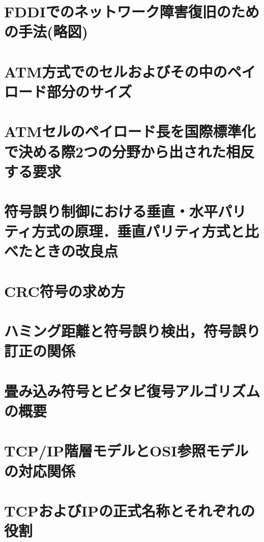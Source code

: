 \documentclass[10.5pt]{jsarticle}
\begin{document}
\section{FDDIでのネットワーク障害復旧のための手法(略図)}



\section{ATM方式でのセルおよびその中のペイロード部分のサイズ}



\section{ATMセルのペイロード長を国際標準化で決める際2つの分野から出された相反する要求}



\section{符号誤り制御における垂直・水平パリティ方式の原理．垂直パリティ方式と比べたときの改良点}



\section{CRC符号の求め方}



\section{ハミング距離と符号誤り検出，符号誤り訂正の関係}



\section{畳み込み符号とビタビ復号アルゴリズムの概要}



\section{TCP/IP階層モデルとOSI参照モデルの対応関係}



\section{TCPおよびIPの正式名称とそれぞれの役割}
\end{document}
